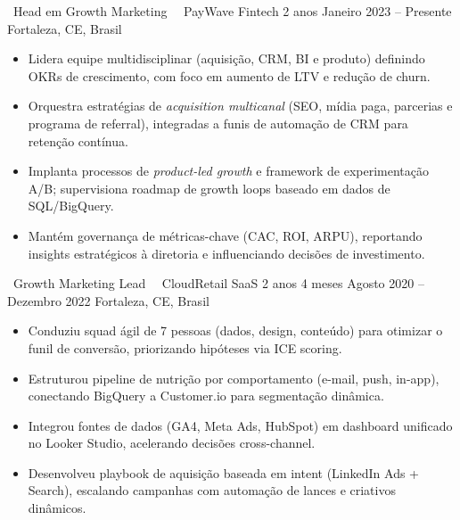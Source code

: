 
\cvevent
{\faChartLine\ Head em Growth Marketing\ \hfill \faAddressCard}
{\faBuilding\ PayWave Fintech \hfill 2 anos}
{Janeiro 2023 -- Presente}
{Fortaleza, CE, Brasil}

\begin{itemize}[leftmargin=*,itemsep=0.5em,topsep=0.5em]
    \item Lidera equipe multidisciplinar (aquisição, CRM, BI e produto) definindo OKRs de crescimento, com foco em aumento de LTV e redução de churn.
    \item Orquestra estratégias de \textit{acquisition multicanal} (SEO, mídia paga, parcerias e programa de referral), integradas a funis de automação de CRM para retenção contínua.
    \item Implanta processos de \textit{product-led growth} e framework de experimentação A/B; supervisiona roadmap de growth loops baseado em dados de SQL/BigQuery.
    \item Mantém governança de métricas-chave (CAC, ROI, ARPU), reportando insights estratégicos à diretoria e influenciando decisões de investimento.
\end{itemize}

\divider

\cvevent
{\faRocket\ Growth Marketing Lead\ \hfill \faAddressCard}
{\faBuilding\ CloudRetail SaaS \hfill 2 anos 4 meses}
{Agosto 2020 -- Dezembro 2022}
{Fortaleza, CE, Brasil}

\begin{itemize}[leftmargin=*,itemsep=0.5em,topsep=0.5em]
\item Conduziu squad ágil de 7 pessoas (dados, design, conteúdo) para otimizar o funil de conversão, priorizando hipóteses via ICE scoring.
\item Estruturou pipeline de nutrição por comportamento (e-mail, push, in-app), conectando BigQuery a Customer.io para segmentação dinâmica.
\item Integrou fontes de dados (GA4, Meta Ads, HubSpot) em dashboard unificado no Looker Studio, acelerando decisões cross-channel.
\item Desenvolveu playbook de aquisição baseada em intent (LinkedIn Ads + Search), escalando campanhas com automação de lances e criativos dinâmicos.
\end{itemize}

\divider

